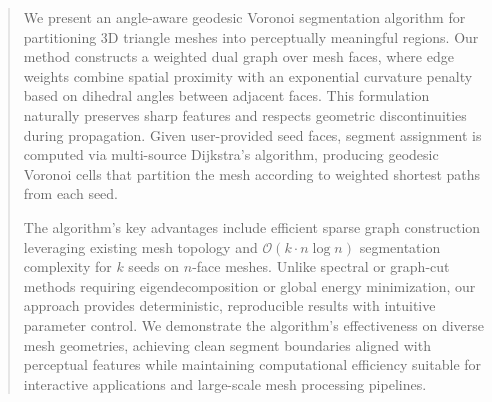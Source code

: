 \begin{abstract}
We present an angle-aware geodesic Voronoi segmentation algorithm for partitioning 3D triangle meshes into perceptually meaningful regions. Our method constructs a weighted dual graph over mesh faces, where edge weights combine spatial proximity with an exponential curvature penalty based on dihedral angles between adjacent faces. This formulation naturally preserves sharp features and respects geometric discontinuities during propagation. Given user-provided seed faces, segment assignment is computed via multi-source Dijkstra's algorithm, producing geodesic Voronoi cells that partition the mesh according to weighted shortest paths from each seed.

The algorithm's key advantages include efficient sparse graph construction leveraging existing mesh topology and $\mathcal{O}(k \cdot n \log n)$ segmentation complexity for $k$ seeds on $n$-face meshes. Unlike spectral or graph-cut methods requiring eigendecomposition or global energy minimization, our approach provides deterministic, reproducible results with intuitive parameter control. We demonstrate the algorithm's effectiveness on diverse mesh geometries, achieving clean segment boundaries aligned with perceptual features while maintaining computational efficiency suitable for interactive applications and large-scale mesh processing pipelines.
\end{abstract}
